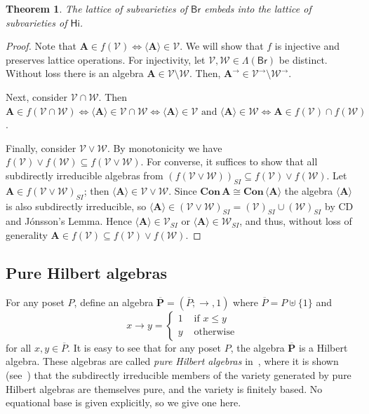 \documentclass{amsart}
\newtheorem{theorem}{Theorem}[section]
\newcommand{\alg}[1]{\mathbf{#1}}
\newcommand{\var}[1]{\mathsf{#1}}
\newcommand{\algov}[1]{\overline{\alg{#1}}}
\newcommand{\ov}[1]{\overline{#1}}
\newcommand{\Con}[1]{\mathbf{Con}\, #1}
\def\ra{\rightarrow}
\begin{document}
\begin{theorem}\label{thm:subvariety-isom}
The lattice of subvarieties of\/ $\var{Br}$ embeds
into the lattice of subvarieties of\/ $\var{Hi}$.
\end{theorem}  

\begin{proof}
Note that $\alg{A}\in f(\mathcal{V})\iff \langle\alg{A}\rangle\in \mathcal{V}$. 
We will show that $f$ is injective and preserves lattice operations.
For injectivity, let $\mathcal{V},\mathcal{W}\in\Lambda(\var{Br})$ be distinct.
Without loss there is an algebra $\alg{A}\in \mathcal{V}\setminus\mathcal{W}$. Then,
$\alg{A}^{\ra} \in \mathcal{V}^\ra\setminus\mathcal{W}^\ra$.

Next, consider $\mathcal{V}\cap\mathcal{W}$. Then
$\alg{A}\in f(\mathcal{V}\cap\mathcal{W}) \iff
\langle\alg{A}\rangle \in \mathcal{V}\cap\mathcal{W}
\iff \langle\alg{A}\rangle \in \mathcal{V} \text{ and }
\langle\alg{A}\rangle \in \mathcal{W}
\iff \alg{A}\in f(\mathcal{V})\cap f(\mathcal{W})$.

Finally, consider $\mathcal{V}\vee\mathcal{W}$. By monotonicity we have
$f(\mathcal{V})\vee f(\mathcal{W})\subseteq f(\mathcal{V}\vee\mathcal{W})$.
For converse, it suffices to show that all subdirectly irreducible
algebras from
$(f(\mathcal{V}\vee\mathcal{W}))_{SI}\subseteq
f(\mathcal{V})\vee f(\mathcal{W})$. Let $\alg{A}\in
f(\mathcal{V}\vee\mathcal{W})_{SI}$; then
$\langle\alg{A}\rangle \in \mathcal{V}\vee\mathcal{W}$.
Since $\Con{\alg{A}}\cong \Con{\langle\alg{A}\rangle}$
the algebra $\langle\alg{A}\rangle$ is also subdirectly irreducible,
so $\langle\alg{A}\rangle \in (\mathcal{V}\vee\mathcal{W})_{SI}
= (\mathcal{V})_{SI}\cup(\mathcal{W})_{SI}$ by CD and J\'onsson's Lemma.
Hence $\langle\alg{A}\rangle \in \mathcal{V}_{SI}$
or $\langle\alg{A}\rangle \in \mathcal{W}_{SI}$, and thus, without loss of generality
$\alg{A}\in f(\mathcal{V})\subseteq f(\mathcal{V})\vee f(\mathcal{W})$.
\end{proof}  

\subsection{Pure Hilbert algebras}\label{sec:pure}

For any poset $P$, define an algebra $\algov{P} = (\ov{P}; \ra, 1)$ where
$\ov{P} = P\uplus \{1\}$ and
$$
x\ra y =
\begin{cases} 
1 & \text{ if } x\leq y\\
y & \text{ otherwise} 
\end{cases}
$$
for all $x,y\in \ov{P}$. It is easy to see that for any poset $P$, the algebra
$\algov{P}$ is a Hilbert algebra. These algebras are called \emph{pure Hilbert
  algebras} in~\cite{BB06}, where it is shown (see~\cite[Theorems~2.2
and~2.3]{BB06}) that  
the subdirectly irreducible members of the variety generated by pure Hilbert
algebras are themselves pure, and the variety is finitely based. No 
equational base is given explicitly, so we give one here.
\end{document}
